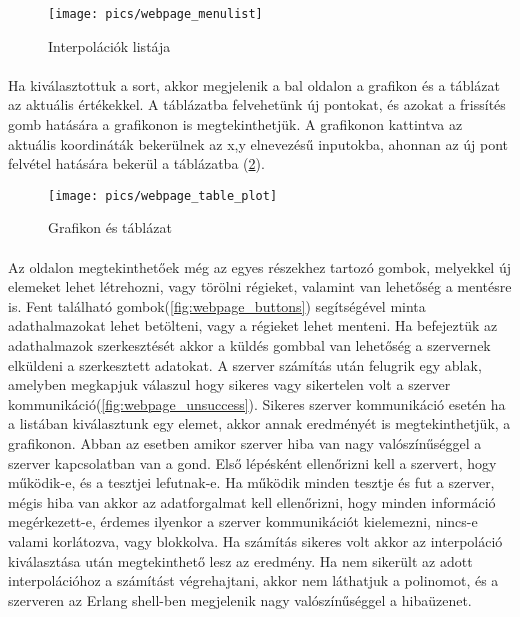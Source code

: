 	\begin{figure}[h]
		\texttt{[image: pics/webpage\_menulist]}
		\centering
		\caption{Interpolációk listája\label{fig:webpage_menulist}}
	\end{figure}
	
	\paragraph{}
	Ha kiválasztottuk a sort, akkor megjelenik a bal oldalon a grafikon és a táblázat az aktuális értékekkel. A táblázatba felvehetünk új pontokat, és azokat a frissítés gomb hatására a grafikonon is megtekinthetjük. A grafikonon kattintva az aktuális koordináták bekerülnek az x,y elnevezésű inputokba, ahonnan az új pont felvétel hatására bekerül a táblázatba (\ref{fig:webpage_table_plot}).

	\begin{figure}[h]
		\texttt{[image: pics/webpage\_table\_plot]}
		\centering
		\caption{Grafikon és táblázat\label{fig:webpage_table_plot}}
	\end{figure}

	\paragraph{}
	Az oldalon megtekinthetőek még az egyes részekhez tartozó gombok, melyekkel új elemeket lehet létrehozni, vagy törölni régieket, valamint van lehetőség a mentésre is.
	Fent található gombok(\ref{fig:webpage_buttons}) segítségével minta adathalmazokat lehet betölteni, vagy a régieket lehet menteni. Ha befejeztük az adathalmazok szerkesztését akkor a küldés gombbal van lehetőség a szervernek elküldeni a szerkesztett adatokat.
	\newline 
	A szerver számítás után felugrik egy ablak, amelyben megkapjuk válaszul hogy sikeres vagy sikertelen volt a szerver kommunikáció(\ref{fig:webpage_unsuccess}).\newline
	Sikeres szerver kommunikáció esetén ha a listában kiválasztunk egy elemet, akkor annak eredményét is megtekinthetjük, a grafikonon.
	\newline Abban az esetben amikor szerver hiba van nagy valószínűséggel a szerver kapcsolatban van a gond. Első lépésként ellenőrizni kell a szervert, hogy működik-e, és a tesztjei lefutnak-e. Ha működik minden tesztje és fut a szerver, mégis hiba van akkor az adatforgalmat kell ellenőrizni, hogy minden információ megérkezett-e, érdemes ilyenkor a szerver kommunikációt kielemezni, nincs-e valami korlátozva, vagy blokkolva.
	\newline
	Ha számítás sikeres volt akkor az interpoláció kiválasztása után megtekinthető lesz az eredmény. Ha nem sikerült az adott interpolációhoz a számítást végrehajtani, akkor nem láthatjuk a polinomot, és a szerveren az Erlang shell-ben megjelenik nagy valószínűséggel a hibaüzenet.


